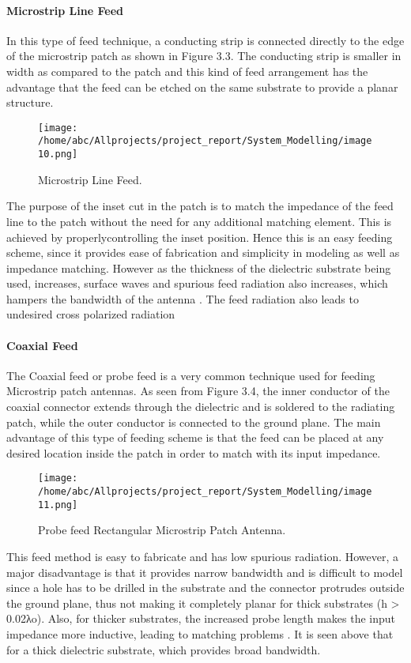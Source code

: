 \documentclass[12pt]{article}
\begin{document}
         \paragraph{ Microstrip Line Feed}
           \justify
            In this type of feed technique, a conducting strip is connected directly to the edge of the microstrip patch as shown in Figure 3.3. The conducting strip is smaller in width as compared to the patch and this kind of feed arrangement has the advantage that the feed can be etched on the same substrate to provide a planar structure.

            \begin{figure}[H]
            	\centering
            	\texttt{[image: /home/abc/Allprojects/project\_report/System\_Modelling/image10.png]}
            	\caption{Microstrip Line Feed.}
            \end{figure}


         	The purpose of the inset cut in the patch is to match the impedance of the feed line to the patch without the need for any additional matching element. This is achieved by properlycontrolling the inset position. Hence this is an easy feeding scheme, since it provides ease of fabrication and simplicity in modeling as well as impedance matching. However as the thickness of the dielectric substrate being used, increases, surface waves and spurious feed radiation also increases, which hampers the bandwidth of the antenna . The feed radiation also leads to undesired cross polarized radiation
         \paragraph{ Coaxial Feed}
          \justify


            The Coaxial feed or probe feed is a very common technique used for feeding Microstrip patch antennas. As seen from Figure 3.4, the inner conductor of the coaxial connector extends through the dielectric and is soldered to the radiating patch, while the outer conductor is connected to the ground plane. The main advantage of this type of feeding scheme is that the feed can be placed at any desired location inside the patch in order to match with its input impedance.
               \begin{figure}[H]
               	\centering
               	\texttt{[image: /home/abc/Allprojects/project\_report/System\_Modelling/image11.png]}
               	\caption{Probe feed Rectangular Microstrip Patch Antenna. }
               \end{figure}
             This feed method is easy to fabricate and has low spurious radiation. However, a major disadvantage is that it provides narrow bandwidth and is difficult to model since a hole has to be drilled in the substrate and the connector protrudes outside the ground plane, thus not making it completely planar for thick substrates (h > 0.02λo). Also, for thicker substrates, the increased probe length makes the input impedance more inductive, leading to matching problems . It is seen above that for a thick dielectric substrate, which provides broad bandwidth.
\end{document}

